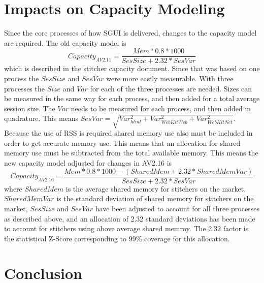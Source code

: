 \documentclass{article}
\begin{document}
\section{Impacts on Capacity Modeling}
\label{SECTION-CapacityModel}

Since the core processes of how SGUI is delivered, changes to the capacity model are required. The old capacity model is $$Capacity_{AV2.11}=\frac{Mem * 0.8 * 1000}{SesSize + 2.32*SesVar}$$ which is described in the stitcher capacity document. Since that was based on one process the $SesSize$ and $SesVar$ were more easily measurable. With three processes the $Size$ and $Var$ for each of the three processes are needed. Sizes can be measured in the same way for each process, and then added for a total average session size. The $Var$ needs to be measured for each process, and then added in quadrature. This means $SesVar=\sqrt{Var_{html}^2 + Var_{WebKitWeb}^2 + Var_{WebKitNet}^2}$. Because the use of RSS is required shared memory use also must be included in order to get accurate memory use. This means that an allocation for shared memory use must be subtracted from the total available memory. This means the new capacity model adjusted for changes in AV2.16 is $$Capacity_{AV2.16}=\frac{Mem * 0.8 * 1000 - (SharedMem + 2.32*SharedMemVar)}{SesSize + 2.32*SesVar}$$ where $SharedMem$ is the average shared memory for stitchers on the market, $SharedMemVar$ is the standard deviation of shared memory for stitchers on the market, $SesSize$ and $SesVar$ have been adjusted to account for all three processes as described above, and an allocation of 2.32 standard deviations has been made to account for stitchers using above average shared memroy. The 2.32 factor is the statistical Z-Score corresponding to 99\% coverage for this allocation.



\section{Conclusion}
\label{SECTION-Conclusion}
\end{document}
